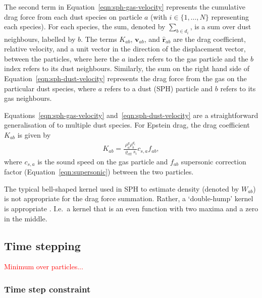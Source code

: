 \documentclass[fleqn,usenatbib]{mnras}
\let\vec\mathbf
\begin{document}
The second term in Equation~\ref{eqn:sph-gas-velocity} represents the cumulative
drag force from each dust species on particle \(a\) (with \(i \in \{1, \ldots,
N\}\) representing each species). For each species, the sum, denoted by
\(\sum_{b \in d_i}\), is a sum over dust neighbours, labelled by \(b\). The
terms \(K_{ab}\), \(\vec{v}_{ab}\), and \(\hat{\vec{r}}_{ab}\) are the drag
coefficient, relative velocity, and a unit vector in the direction of the
displacement vector, between the particles, where here the \(a\) index refers to
the gas particle and the \(b\) index refers to its dust neighbours. Similarly,
the sum on the right hand side of Equation~\ref{eqn:sph-dust-velocity}
represents the drag force from the gas on the particular dust species, where
\(a\) refers to a dust (SPH) particle and \(b\) refers to its gas neighbours.

Equations~\ref{eqn:sph-gas-velocity} and~\ref{eqn:sph-dust-velocity} are a
straightforward generalisation of \citet{Laibe2012MNRAS.420.2345L} to multiple
dust species. For Epstein drag, the drag coefficient \(K_{ab}\) is given by
%
\begin{align}
   K_{ab} = \frac{\rho^g_a \rho^{d_i}_b}{\varrho_{\mathrm{eff}} s_i} c_{s,a} f_{ab},
\end{align}
%
where \(c_{s,a}\) is the sound speed on the gas particle and \(f_{ab}\)
supersonic correction factor (Equation~\ref{eqn:supersonic}) between the two
particles.

The typical bell-shaped kernel used in SPH to estimate density (denoted by
\(W_{ab}\)) is not appropriate for the drag force summation. Rather, a
`double-hump' kernel is appropriate \citep{Laibe2012MNRAS.420.2345L}. I.e.\ a
kernel that is an even function with two maxima and a zero in the middle.

\subsection{Time stepping}

\textcolor{red}{Minimum over particles...}

\subsubsection{Time step constraint}
\end{document}
